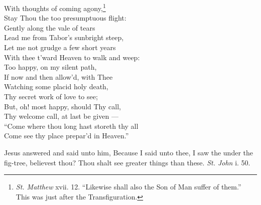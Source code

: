  With thoughts of coming agony,\footnote{\emph{St. Matthew} xvii. 12. “Likewise shall also the Son of Man suffer of them.” This was just after the Transfiguration.} \\
 Stay Thou the too presumptuous flight: \\
 Gently along the vale of tears \\
 Lead me from Tabor’s sunbright steep, \\
 Let me not grudge a few short years \\
 With thee t’ward Heaven to walk and weep: \\
  Too happy, on my silent path, \\
 If now and then allow’d, with Thee \\
 Watching some placid holy death, \\
 Thy secret work of love to see; \\
 But, oh! most happy, should Thy call, \\
 Thy welcome call, at last be given — \\
 “Come where thou long hast storeth thy all \\
 Come see thy place prepar’d in Heaven.”\\


Jesus answered and said unto him, Because I said unto thee, I saw the under the fig-tree, believest thou? Thou shalt see greater things than these. \emph{St. John} i. 50.

